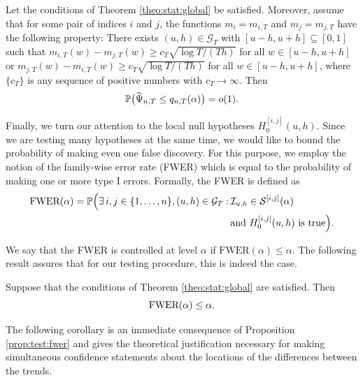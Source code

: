 \documentclass[a4paper,12pt]{article}
\begin{document}
\begin{prop}\label{prop:test:power}
Let the conditions  of Theorem \ref{theo:stat:global} be satisfied. Moreover, assume that for some pair of indices $i$ and $j$, the functions $m_ i = m_{i,T}$ and $m_ j = m_{j,T}$ have the following property: There exists $(u, h) \in \mathcal{G}_T$ with $[u-h, u+h] \subseteq [0,1]$ such that $m_{i,T}(w) - m_{j,T}(w) \ge c_T \sqrt{\log T/(Th)}$ for all $w \in [u-h, u+h]$ or $m_{j,T}(w) - m_{i,T}(w) \ge c_T \sqrt{\log T/(Th)}$ for all $w \in [u-h, u+h]$, where $\{c_T\}$ is any sequence of positive numbers with $c_T \rightarrow \infty$. Then 
\[ \mathbb{P} \big( \widehat{\Psi}_{n,T} \le q_{n,T}(\alpha) \big) = o(1). \]
\end{prop}


Finally, we turn our attention to the local null hypotheses $H_0^{[i, j]}(u, h)$. Since we are testing many hypotheses at the same time, we would like to bound the probability of making even one false discovery. For this purpose, we employ the notion of the family-wise error rate (FWER) which is equal to the probability of making one or more type I errors. Formally, the FWER is defined as
\begin{align*} 
\text{FWER}(\alpha) = \mathbb{P} \Big(\exists \,  i, j \in \{1, \ldots, n \}, (u, h) \in \mathcal{G}_T : & \, \mathcal{I}_{u, h} \in \mathcal{S}^{[i, j]}(\alpha) \\ & \, \text{and } H_0^{[i, j]}(u, h) \text { is true}\Big).
\end{align*}

We say that the FWER is controlled at level $\alpha$ if $\text{FWER}(\alpha) \leq \alpha$. The following result assures that for our testing procedure, this is indeed the case.

\begin{prop}\label{prop:test:fwer}
Suppose that the conditions  of Theorem \ref{theo:stat:global} are satisfied. Then 
\[ \textnormal{FWER}(\alpha) \leq \alpha. \]
\end{prop}


The following corollary is an immediate consequence of Proposition \ref{prop:test:fwer} and gives the theoretical justification necessary for making simultaneous confidence statements about the locations of the differences between the trends.
\end{document}
